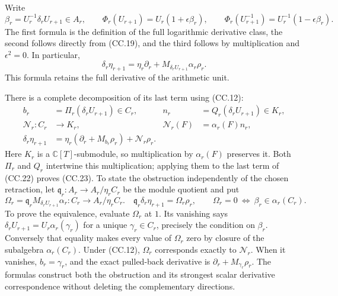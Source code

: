 Write
\[
 \beta_r=U_r^{-1}\delta_rU_{r+1}\in A_r,\qquad
 \Phi_r(U_{r+1})=U_r(1+\epsilon\beta_r),\qquad
 \Phi_r(U_{r+1}^{-1})=U_r^{-1}(1-\epsilon\beta_r).
 \tag{CC.21}
\]
The first formula is the definition of the full logarithmic derivative
class, the second follows directly from (CC.19), and the third follows
by multiplication and \(\epsilon^2=0\).
In particular,
\[
 \delta_r\eta_{r+1}
   =\eta_r\partial_r+
      M_{\delta_rU_{r+1}}\alpha_r\rho_r.
 \tag{CC.22}
\]
This formula retains the full derivative of the arithmetic unit.

There is a complete decomposition of its last term using (CC.12):
\[
\begin{split}
 b_r&=\Pi_r(\delta_rU_{r+1})\in C_r,&
 n_r&=Q_r(\delta_rU_{r+1})\in K_r,\\
 \mathcal N_r:C_r&\longrightarrow K_r,&
 \mathcal N_r(F)&=\alpha_r(F)n_r,\\
 \delta_r\eta_{r+1}
   &=\eta_r(\partial_r+M_{b_r}\rho_r)+\mathcal N_r\rho_r .
\end{split}
\tag{CC.23}
\]
Here \(K_r\) is a \(\mathbb C[T]\)-submodule, so multiplication
by \(\alpha_r(F)\) preserves it.  Both \(\Pi_r\) and \(Q_r\)
intertwine this multiplication; applying them to the last term
of (CC.22) proves (CC.23).
To state the obstruction independently of the chosen retraction, let
\(\mathfrak q_r:A_r\to A_r/\eta_rC_r\) be the module quotient and put
\[
 \Omega_r=\mathfrak q_r M_{\delta_rU_{r+1}}\alpha_r:
 C_r\longrightarrow A_r/\eta_rC_r.
 \quad
 \mathfrak q_r\delta_r\eta_{r+1}=\Omega_r\rho_r,
 \qquad
 \Omega_r=0\ \Longleftrightarrow\ \beta_r\in\alpha_r(C_r).
 \tag{CC.24}
\]
To prove the equivalence, evaluate \(\Omega_r\) at \(1\).
Its vanishing says \(\delta_rU_{r+1}=U_r\alpha_r(\gamma_r)\)
for a unique \(\gamma_r\in C_r\), precisely the condition on \(\beta_r\).
Conversely that equality makes every value of \(\Omega_r\) zero
by closure of the subalgebra \(\alpha_r(C_r)\).
Under (CC.12), \(\Omega_r\) corresponds exactly to \(\mathcal N_r\).
When it vanishes, \(b_r=\gamma_r\), and the exact pulled-back
derivative is \(\partial_r+M_{\gamma_r}\rho_r\).
The formulas construct both the obstruction and its strongest
scalar derivative correspondence without deleting the complementary
directions.
